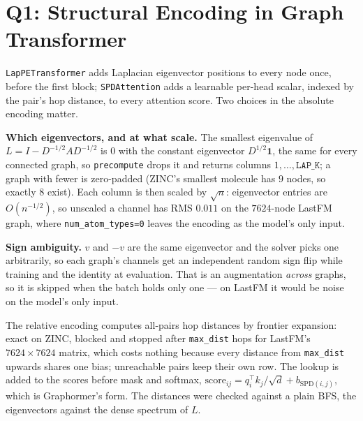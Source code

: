 \section{Q1: Structural Encoding in Graph Transformer}

\texttt{LapPETransformer} adds Laplacian eigenvector positions to every node once, before the
first block; \texttt{SPDAttention} adds a learnable per-head scalar, indexed by the pair's hop
distance, to every attention score. Two choices in the absolute encoding matter.

\textbf{Which eigenvectors, and at what scale.} The smallest eigenvalue of
$L = I - D^{-1/2} A D^{-1/2}$ is $0$ with the constant eigenvector $D^{1/2}\mathbf{1}$, the same
for every connected graph, so \texttt{precompute} drops it and returns columns
$1,\dots,\texttt{LAP\_K}$; a graph with fewer is zero-padded (ZINC's smallest molecule has $9$
nodes, so exactly $8$ exist). Each column is then scaled by $\sqrt{n}$:
eigenvector entries are $O(n^{-1/2})$, so unscaled a channel has RMS $0.011$ on the $7624$-node
LastFM graph, where \texttt{num\_atom\_types=0} leaves the encoding as the model's only input.

\textbf{Sign ambiguity.} $v$ and $-v$ are the same eigenvector and the solver picks one
arbitrarily, so each graph's channels get an independent random sign flip while training and the
identity at evaluation. That is an augmentation \emph{across} graphs, so it is skipped when the
batch holds only one --- on LastFM it would be noise on the model's only input.

The relative encoding computes all-pairs hop distances by frontier expansion: exact on ZINC,
blocked and stopped after \texttt{max\_dist} hops for LastFM's $7624 \times 7624$ matrix, which
costs nothing because every distance from \texttt{max\_dist} upwards shares one bias;
unreachable pairs keep their own row. The lookup is added to the scores before mask and softmax,
$\mathrm{score}_{ij} = q_i^\top k_j/\sqrt{d} + b_{\mathrm{SPD}(i,j)}$, which is Graphormer's
form. The distances were checked against a plain BFS, the eigenvectors against the dense
spectrum of $L$.

